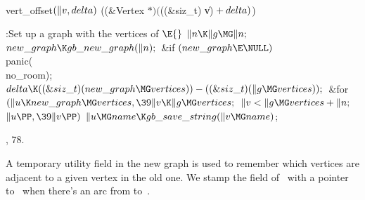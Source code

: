\Y\B\4\D\\{vert\_offset}$(\|v,\\{delta})$\5
((\&{Vertex} ${}{*})({}$((\&{siz\_t}) \|v)${}+\\{delta}){}$)\par
\Y\B\4:Set up a graph with the vertices of \X${}\E{}$\6
$\|n\K\|g\MG\|n;{}$\6
${}\\{new\_graph}\K\\{gb\_new\_graph}(\|n);{}$\6
\&{if} ${}(\\{new\_graph}\E\NULL){}$\1\5
\\{panic}(\\{no\_room});\2\6
${}\\{delta}\K((\&{siz\_t})(\\{new\_graph}\MG\\{vertices}))-((\&{siz\_t})(\|g%
\MG\\{vertices}));{}$\6
\&{for} ${}(\|u\K\\{new\_graph}\MG\\{vertices},\39\|v\K\|g\MG\\{vertices};{}$
${}\|v<\|g\MG\\{vertices}+\|n;{}$ ${}\|u\PP,\39\|v\PP){}$\1\5
${}\|u\MG\\{name}\K\\{gb\_save\_string}(\|v\MG\\{name}){}$;\2\par
{}, 78.\fi

A temporary utility field in the new graph is used to remember which
vertices are adjacent to a given vertex in the old one. We stamp the 
field of~ with a pointer to~ when there's an arc from 
to~.

